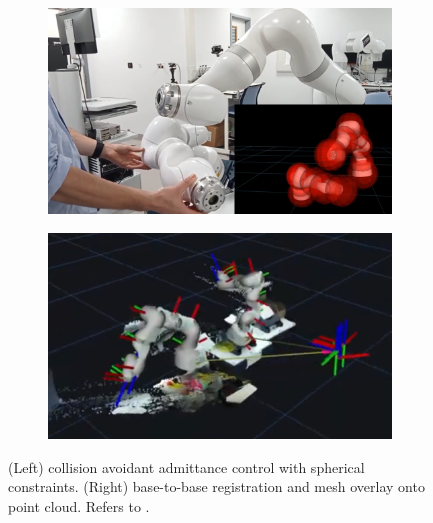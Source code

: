 \begin{figure}[tbh]
    \centering
    \begin{subfigure}[b]{0.49\textwidth}
        \centering
        \includegraphics[width=\textwidth]{chapter_1/img/admittance_avoidance.png}
    \end{subfigure}
    \begin{subfigure}[b]{0.49\textwidth}
        \centering
        \includegraphics[width=\textwidth]{chapter_1/img/base_to_base_reg.png}
    \end{subfigure}
    \caption{(Left) collision avoidant admittance control with spherical constraints. (Right) base-to-base registration and mesh overlay onto point cloud. Refers to .}
    \label{c1:fig:admittance_base_to_base}
\end{figure}

